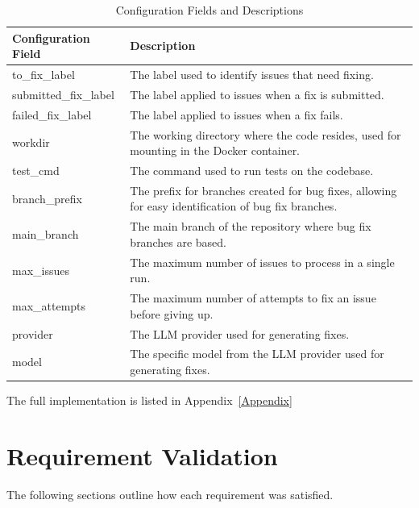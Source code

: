 \renewcommand{\arraystretch}{1.5}
\begin{longtable}{@{\extracolsep{\fill}} p{3.5cm} | p{11cm} @{}}
    \caption{Configuration Fields and Descriptions} \label{table:configuration}                                                         \\
    \toprule
    \textbf{Configuration Field} & \textbf{Description}                                                                                 \\
    \midrule
    \endfirsthead

    \bottomrule
    \endfoot

    to\_fix\_label               & The label used to identify issues that need fixing.                                                  \\ \hline
    submitted\_fix\_label        & The label applied to issues when a fix is submitted.                                                 \\ \hline
    failed\_fix\_label           & The label applied to issues when a fix fails.                                                        \\ \hline
    workdir                      & The working directory where the code resides, used for mounting in the Docker container.             \\ \hline
    test\_cmd                    & The command used to run tests on the codebase.                                                       \\ \hline
    branch\_prefix               & The prefix for branches created for bug fixes, allowing for easy identification of bug fix branches. \\ \hline
    main\_branch                 & The main branch of the repository where bug fix branches are based.                                  \\ \hline
    max\_issues                  & The maximum number of issues to process in a single run.                                             \\\hline
    max\_attempts                & The maximum number of attempts to fix an issue before giving up.                                     \\ \hline
    provider                     & The LLM provider used for generating fixes.                                                          \\ \hline
    model                        & The specific model from the LLM provider used for generating fixes.                                  \\
\end{longtable}


The full implementation is listed in Appendix~\ref{Appendix}

\section{Requirement Validation}

The following sections outline how each requirement was satisfied.